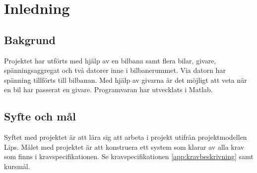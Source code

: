 \section{Inledning}

\subsection{Bakgrund} Projektet har utförts med hjälp av en bilbana samt
flera bilar, givare, spänningsaggregat och två datorer inne i bilbanerummet. Via datorn har spänning tillförts till bilbanan. Med hjälp av givarna är
det möjligt att veta när en bil har passerat en givare.  Programvaran har utvecklats
i Matlab.

\subsection{Syfte och mål}

Syftet med projektet är att lära sig att arbeta i projekt utifrån projektmodellen Lips. Målet med projektet är att konstruera ett system som klarar av alla krav som finns i kravspecifikationen. Se kravspecifikationen \ref{app:kravbeskrivning} samt kursmål.